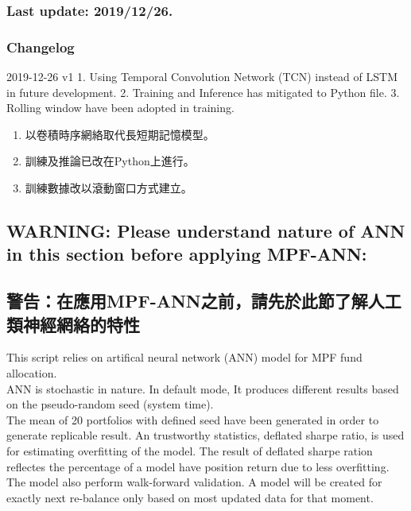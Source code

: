 \documentclass[
]{article}
\providecommand{\tightlist}{%
  \setlength{\itemsep}{0pt}\setlength{\parskip}{0pt}}
\begin{document}
\hypertarget{last-update-20191226.}{%
\subsubsection{Last update: 2019/12/26.}\label{last-update-20191226.}}

\hypertarget{changelog}{%
\subsubsection{Changelog}\label{changelog}}

2019-12-26 v1 1. Using Temporal Convolution Network (TCN) instead of
LSTM in future development. 2. Training and Inference has mitigated to
Python file. 3. Rolling window have been adopted in training.

\begin{enumerate}
\def\labelenumi{\arabic{enumi}.}
\tightlist
\item
  以卷積時序網絡取代長短期記憶模型。
\item
  訓練及推論已改在Python上進行。
\item
  訓練數據改以滾動窗口方式建立。
\end{enumerate}

\hypertarget{warning-please-understand-nature-of-ann-in-this-section-before-applying-mpf-ann}{%
\subsection{WARNING: Please understand nature of ANN in this section
before applying
MPF-ANN:}\label{warning-please-understand-nature-of-ann-in-this-section-before-applying-mpf-ann}}

\hypertarget{ux8b66ux544aux5728ux61c9ux7528mpf-annux4e4bux524dux8acbux5148ux65bcux6b64ux7bc0ux4e86ux89e3ux4ebaux5de5ux985eux795eux7d93ux7db2ux7d61ux7684ux7279ux6027}{%
\subsection{警告：在應用MPF-ANN之前，請先於此節了解人工類神經網絡的特性}\label{ux8b66ux544aux5728ux61c9ux7528mpf-annux4e4bux524dux8acbux5148ux65bcux6b64ux7bc0ux4e86ux89e3ux4ebaux5de5ux985eux795eux7d93ux7db2ux7d61ux7684ux7279ux6027}}

This script relies on artifical neural network (ANN) model for MPF fund
allocation.\\
ANN is stochastic in nature. In default mode, It produces different
results based on the pseudo-random seed (system time).\\
The mean of 20 portfolios with defined seed have been generated in order
to generate replicable result. An trustworthy statistics, deflated
sharpe ratio, is used for estimating overfitting of the model. The
result of deflated sharpe ration reflectes the percentage of a model
have position return due to less overfitting.\\
The model also perform walk-forward validation. A model will be created
for exactly next re-balance only based on most updated data for that
moment.
\end{document}
